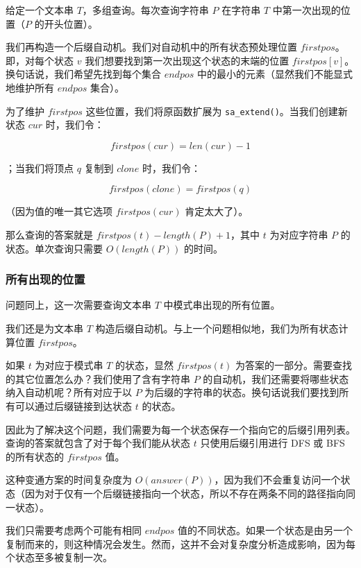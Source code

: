 \begin{QUOTE}{}{}
给定一个文本串 $T$，多组查询。每次查询字符串 $P$ 在字符串 $T$ 中第一次出现的位置（$P$ 的开头位置）。
\end{QUOTE}

我们再构造一个后缀自动机。我们对自动机中的所有状态预处理位置 $firstpos$。即，对每个状态 $v$ 我们想要找到第一次出现这个状态的末端的位置 $firstpos[v]$。换句话说，我们希望先找到每个集合 $endpos$ 中的最小的元素（显然我们不能显式地维护所有 $endpos$ 集合）。

为了维护 $firstpos$ 这些位置，我们将原函数扩展为 \texttt{sa_extend()}。当我们创建新状态 $cur$ 时，我们令：

$$
firstpos(cur)=len(cur)-1
$$

；当我们将顶点 $q$ 复制到 $clone$ 时，我们令：

$$
firstpos(clone)=firstpos(q)
$$

（因为值的唯一其它选项 $firstpos(cur)$ 肯定太大了）。

那么查询的答案就是 $firstpos(t)-length(P)+1$，其中 $t$ 为对应字符串 $P$ 的状态。单次查询只需要 $O(length(P))$ 的时间。

\subsubsection{所有出现的位置}

\begin{QUOTE}{}{}
问题同上，这一次需要查询文本串 $T$ 中模式串出现的所有位置。
\end{QUOTE}

我们还是为文本串 $T$ 构造后缀自动机。与上一个问题相似地，我们为所有状态计算位置 $firstpos$。

如果 $t$ 为对应于模式串 $T$ 的状态，显然 $firstpos(t)$ 为答案的一部分。需要查找的其它位置怎么办？我们使用了含有字符串 $P$ 的自动机，我们还需要将哪些状态纳入自动机呢？所有对应于以 $P$ 为后缀的字符串的状态。换句话说我们要找到所有可以通过后缀链接到达状态 $t$ 的状态。

因此为了解决这个问题，我们需要为每一个状态保存一个指向它的后缀引用列表。查询的答案就包含了对于每个我们能从状态 $t$ 只使用后缀引用进行 DFS 或 BFS 的所有状态的 $firstpos$ 值。

这种变通方案的时间复杂度为 $O(answer(P))$，因为我们不会重复访问一个状态（因为对于仅有一个后缀链接指向一个状态，所以不存在两条不同的路径指向同一状态）。

我们只需要考虑两个可能有相同 $endpos$ 值的不同状态。如果一个状态是由另一个复制而来的，则这种情况会发生。然而，这并不会对复杂度分析造成影响，因为每个状态至多被复制一次。


